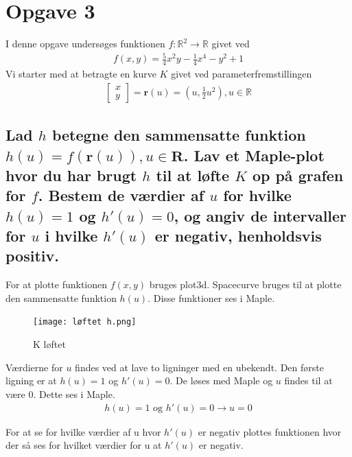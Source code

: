 \section{Opgave 3}
I denne opgave undersøges funktionen $f:\mathbb{R}^2 \rightarrow \mathbb{R}$ givet ved
\begin{align*}
f(x,y) = \frac{5}{4} x^2 y-\frac14 x^4 -y^2+1
\end{align*}
Vi starter med at betragte en kurve $K$ givet ved parameterfremstillingen
\begin{align}
\left[
    \begin{array}{c}
        x\\y
    \end{array}
\right] 
= \textbf{r}(u) = \left(u,\frac12 u^2 \right), u\in \mathbb{R}
\end{align}
\subsection{Lad $h$ betegne den sammensatte funktion $h(u)=f(\textbf{r}(u)),u\in \textbf{R}$. Lav et Maple-plot hvor du har brugt $h$ til at løfte $K$ op på grafen for $f$. Bestem de værdier af $u$ for hvilke $h(u)=1$ og $h'(u)=0$, og angiv de intervaller for $u$ i hvilke $h'(u)$ er negativ, henholdsvis positiv.}

For at plotte funktionen $f(x,y)$ bruges plot3d. Spacecurve bruges til at plotte den sammensatte funktion $h(u)$. Disse funktioner ses i Maple.

\begin{figure}[htp]
    \centering
    \texttt{[image: løftet h.png]}
        \caption{K løftet}
    \label{hlift}
\end{figure}

Værdierne for $u$ findes ved at lave to ligninger med en ubekendt. Den første ligning er at $h(u)=1$ og $h'(u)=0$. De løses med Maple og $u$ findes til at være 0. Dette ses i Maple.
\begin{align}
    h(u)=1 \text{ og } h'(u)=0 \rightarrow u=0
\end{align}

For at se for hvilke værdier af u hvor $h'(u)$ er negativ plottes funktionen hvor der så ses for hvilket værdier for u at $h'(u)$ er negativ.

